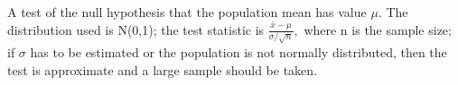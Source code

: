  A test of the null hypothesis that the population mean has
value $ \mu . $ The distribution used is N(0,1); the test statistic
is $ \frac{ \bar{x} - \mu }{\sigma / \sqrt{n}} , $ where
n is the sample size; if $ \sigma $ has
to be estimated or the population is not normally distributed, then
the test is approximate and a large sample should be taken.
